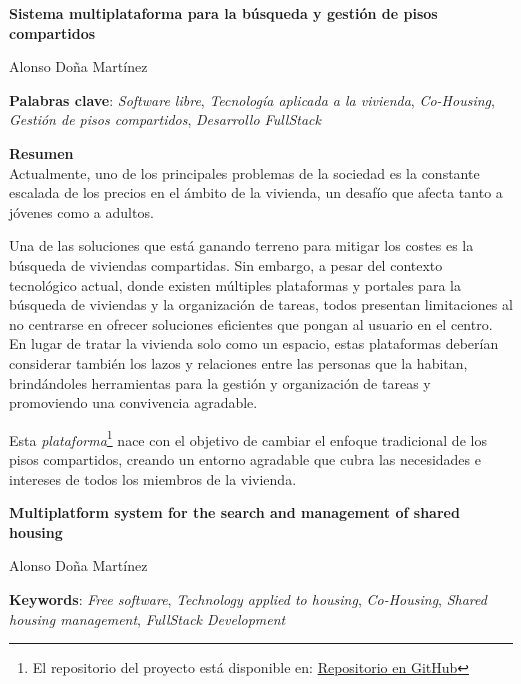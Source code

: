 \thispagestyle{empty}

\begin{center}
{\large\bfseries Sistema multiplataforma para la búsqueda y gestión de pisos compartidos }\\
\end{center}
\begin{center}
Alonso Doña Martínez\\
\end{center}


\vspace{0.5cm}
\noindent\textbf{Palabras clave}: \textit{Software libre}, \textit{Tecnología aplicada a la vivienda}, \textit{Co-Housing}, \textit{Gestión de pisos compartidos}, \textit{Desarrollo FullStack}
\vspace{0.7cm}

\noindent\textbf{Resumen}\\

Actualmente, uno de los principales problemas de la sociedad es la constante escalada de los precios en el ámbito de la vivienda, un desafío que afecta tanto a jóvenes como a adultos.

Una de las soluciones que está ganando terreno para mitigar los costes es la búsqueda de viviendas compartidas. Sin embargo, a pesar del contexto tecnológico actual, donde existen múltiples plataformas y portales para la búsqueda de viviendas y la organización de tareas, todos presentan limitaciones al no centrarse en ofrecer soluciones eficientes que pongan al usuario en el centro. En lugar de tratar la vivienda solo como un espacio, estas plataformas deberían considerar también los lazos y relaciones entre las personas que la habitan, brindándoles herramientas para la gestión y organización de tareas y promoviendo una convivencia agradable.

Esta \textit{plataforma}\footnote{El repositorio del proyecto está disponible en: 
\href{https://github.com/alonsodm12/TFG_COHOUSING}{Repositorio en GitHub}} nace con el objetivo de cambiar el enfoque tradicional de los pisos compartidos, creando un entorno agradable que cubra las necesidades e intereses de todos los miembros de la vivienda.



\cleardoublepage
\begin{center}
	{\large\bfseries Multiplatform system for the search and management of shared housing}\\
\end{center}
\begin{center}
	Alonso Doña Martínez\\
\end{center}
\vspace{0.5cm}
\noindent\textbf{Keywords}: \textit{Free software}, \textit{Technology applied to housing}, \textit{Co-Housing}, \textit{Shared housing management}, \textit{FullStack Development}
\vspace{0.7cm}

